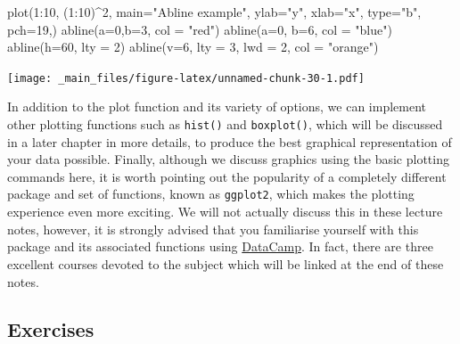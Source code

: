\documentclass[
]{book}
\newenvironment{Shaded}{\begin{snugshade}}{\end{snugshade}}
\newcommand{\AttributeTok}[1]{\textcolor[rgb]{0.77,0.63,0.00}{#1}}
\newcommand{\DecValTok}[1]{\textcolor[rgb]{0.00,0.00,0.81}{#1}}
\newcommand{\FunctionTok}[1]{\textcolor[rgb]{0.00,0.00,0.00}{#1}}
\newcommand{\NormalTok}[1]{#1}
\newcommand{\SpecialCharTok}[1]{\textcolor[rgb]{0.00,0.00,0.00}{#1}}
\newcommand{\StringTok}[1]{\textcolor[rgb]{0.31,0.60,0.02}{#1}}
\theoremstyle{definition}
\theoremstyle{definition}
\theoremstyle{definition}
\theoremstyle{definition}
\theoremstyle{remark}
\begin{document}
\begin{Shaded}
\begin{Highlighting}[]
\FunctionTok{plot}\NormalTok{(}\DecValTok{1}\SpecialCharTok{:}\DecValTok{10}\NormalTok{, (}\DecValTok{1}\SpecialCharTok{:}\DecValTok{10}\NormalTok{)}\SpecialCharTok{\^{}}\DecValTok{2}\NormalTok{,}
     \AttributeTok{main=}\StringTok{"Abline example"}\NormalTok{,}
     \AttributeTok{ylab=}\StringTok{"y"}\NormalTok{,}
     \AttributeTok{xlab=}\StringTok{"x"}\NormalTok{,}
     \AttributeTok{type=}\StringTok{"b"}\NormalTok{,}
     \AttributeTok{pch=}\DecValTok{19}\NormalTok{,)}
\FunctionTok{abline}\NormalTok{(}\AttributeTok{a=}\DecValTok{0}\NormalTok{,}\AttributeTok{b=}\DecValTok{3}\NormalTok{, }\AttributeTok{col =} \StringTok{"red"}\NormalTok{)}
\FunctionTok{abline}\NormalTok{(}\AttributeTok{a=}\DecValTok{0}\NormalTok{, }\AttributeTok{b=}\DecValTok{6}\NormalTok{, }\AttributeTok{col =} \StringTok{"blue"}\NormalTok{)}
\FunctionTok{abline}\NormalTok{(}\AttributeTok{h=}\DecValTok{60}\NormalTok{, }\AttributeTok{lty =} \DecValTok{2}\NormalTok{)}
\FunctionTok{abline}\NormalTok{(}\AttributeTok{v=}\DecValTok{6}\NormalTok{, }\AttributeTok{lty =} \DecValTok{3}\NormalTok{, }\AttributeTok{lwd =} \DecValTok{2}\NormalTok{, }\AttributeTok{col =} \StringTok{"orange"}\NormalTok{)}
\end{Highlighting}
\end{Shaded}

\texttt{[image: \_main\_files/figure-latex/unnamed-chunk-30-1.pdf]}

In addition to the plot function and its variety of options, we can implement other plotting functions such as \texttt{hist()} and \texttt{boxplot()}, which will be discussed in a later chapter in more details, to produce the best graphical representation of your data possible. Finally, although we discuss graphics using the basic plotting commands here, it is worth pointing out the popularity of a completely different package and set of functions, known as \texttt{ggplot2}, which makes the plotting experience even more exciting. We will not actually discuss this in these lecture notes, however, it is strongly advised that you familiarise yourself with this package and its associated functions using \href{www.datacamp.com}{DataCamp}. In fact, there are three excellent courses devoted to the subject which will be linked at the end of these notes.

\hypertarget{exercises-2}{%
\subsection{Exercises}\label{exercises-2}}
\end{document}
